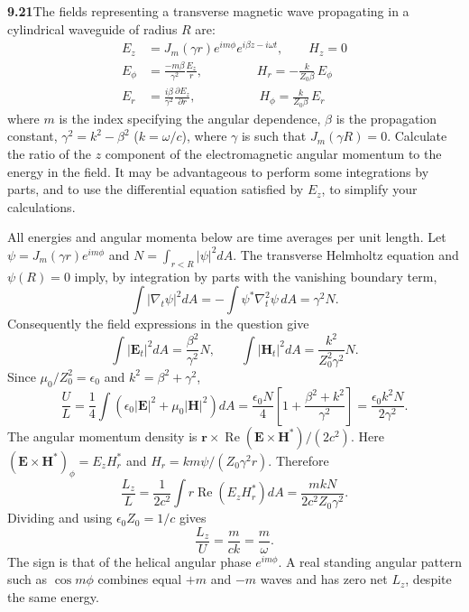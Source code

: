 \par\bigskip
\noindent\textbf{9.21}\quad The fields representing a transverse magnetic wave propagating in a cylindrical waveguide of radius $R$ are:
\begin{align*}
E_{z}&=J_{m}(\gamma r)e^{im\phi}e^{i\beta z-i\omega t},\qquad H_{z}=0\\[4pt]
E_{\phi}&=\frac{-m\beta}{\gamma^{2}}\frac{E_{z}}{r},\qquad\qquad\; H_{r}=-\frac{k}{Z_{0}\beta}\,E_{\phi}\\[4pt]
E_{r}&=\frac{i\beta}{\gamma^{2}}\frac{\partial E_{z}}{\partial r},\qquad\qquad\quad H_{\phi}=\frac{k}{Z_{0}\beta}\,E_{r}
\end{align*}
where $m$ is the index specifying the angular dependence, $\beta$ is the propagation constant, $\gamma^{2}=k^{2}-\beta^{2}$ ($k=\omega/c$), where $\gamma$ is such that $J_{m}(\gamma R)=0$. Calculate the ratio of the $z$ component of the electromagnetic angular momentum to the energy in the field. It may be advantageous to perform some integrations by parts, and to use the differential equation satisfied by $E_{z}$, to simplify your calculations.
\solution

All energies and angular momenta below are time averages per unit length.
Let $\psi=J_m(\gamma r)e^{im\phi}$ and
$N=\int_{r<R}|\psi|^2dA$.
The transverse Helmholtz equation and $\psi(R)=0$ imply, by integration
by parts with the vanishing boundary term,
\[
\int|\nabla_t\psi|^2dA=-\int\psi^*\nabla_t^2\psi\,dA=\gamma^2N.
\]
Consequently the field expressions in the question give
\[
\int|\mathbf E_t|^2dA=\frac{\beta^2}{\gamma^2}N,
\qquad
\int|\mathbf H_t|^2dA=\frac{k^2}{Z_0^2\gamma^2}N.
\]
Since $\mu_0/Z_0^2=\epsilon_0$ and $k^2=\beta^2+\gamma^2$,
\[
\frac UL=\frac14\int(\epsilon_0|\mathbf E|^2+
\mu_0|\mathbf H|^2)dA
=\frac{\epsilon_0N}{4}
\left[1+\frac{\beta^2+k^2}{\gamma^2}\right]
=\frac{\epsilon_0k^2N}{2\gamma^2}.
\]
The angular momentum density is
$\mathbf r\times\operatorname{Re}(\mathbf E\times\mathbf H^*)/(2c^2)$.
Here $(\mathbf E\times\mathbf H^*)_\phi=E_zH_r^*$ and
$H_r=km\psi/(Z_0\gamma^2r)$. Therefore
\[
\frac{L_z}{L}=\frac1{2c^2}\int r\operatorname{Re}(E_zH_r^*)dA
=\frac{mkN}{2c^2Z_0\gamma^2}.
\]
Dividing and using $\epsilon_0Z_0=1/c$ gives
\[
\boxed{\frac{L_z}{U}=\frac{m}{ck}=\frac m\omega.}
\]
The sign is that of the helical angular phase $e^{im\phi}$.
A real standing angular pattern such as $\cos m\phi$ combines equal
$+m$ and $-m$ waves and has zero net $L_z$, despite the same energy.

